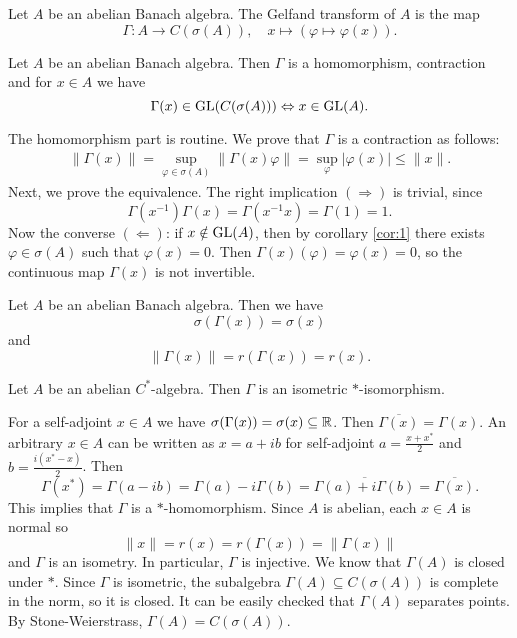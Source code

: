 \begin{definition}
  Let $A$ be an abelian Banach algebra. The Gelfand transform of $A$ is the map 
  $$\Gamma: A \to C(\sigma(A)),\quad x \mapsto (\varphi \mapsto \varphi(x)).$$
\end{definition}

\begin{theorem}
  Let $A$ be an abelian Banach algebra. Then $\Gamma$ is a homomorphism, contraction and for 
  $x \in A$ we have $$\Gamma(x) \in \operatorname{GL}(C(\sigma (A))) \Leftrightarrow x \in \operatorname{GL}(A).$$
\end{theorem}

\begin{myproof}
  The homomorphism part is routine. We prove that $\Gamma$ is a contraction as follows:
  \begin{align*}
    \| \Gamma(x)\| = \sup_{\varphi \in \sigma (A)} \| \Gamma(x) \varphi\| = \sup_{\varphi} |\varphi(x)| \leq \|x\|.
  \end{align*}
  Next, we prove the equivalence. The right implication $(\Rightarrow)$ is trivial, since 
  $$\Gamma(x^{-1}) \Gamma(x) = \Gamma(x^{-1} x) = \Gamma(1) = 1.$$
  Now the converse $(\Leftarrow)$: if $x \notin \operatorname{GL}(A)$,
  then by corollary \ref{cor:1} there exists $\varphi \in \sigma(A)$ such that $\varphi(x) = 0$.
  Then $\Gamma(x) (\varphi) = \varphi(x) = 0$, so the continuous map $\Gamma(x)$ is not invertible.
\end{myproof}

\begin{corollary}
  Let $A$ be an abelian Banach algebra. Then 
  we have $$\sigma (\Gamma(x)) = \sigma (x)$$
  and $$\| \Gamma(x)\| = r (\Gamma(x)) = r(x).$$
\end{corollary}

\begin{theorem}[Gelfand]
  Let $A$ be an abelian $C^*$-algebra. Then $\Gamma$ is an isometric $*$-isomorphism.
\end{theorem}

\begin{myproof}
  For a self-adjoint $x \in A$ we have $\sigma (\Gamma(x)) = \sigma(x) \subseteq \mathbb {R}$.
  Then $\overline{\Gamma(x)} = \Gamma(x)$. An arbitrary $x \in A$ can be written as $x = a + ib$
  for self-adjoint $a= \frac{x + x^*}{2}$ and $b = \frac{i(x^* - x)}{2}$.
  Then $$\Gamma(x^*) = \Gamma(a - ib) = \Gamma(a) - i \Gamma(b) = \overline{\Gamma(a) + i \Gamma(b)} = \overline{\Gamma(x)}.$$
  This implies that $\Gamma$ is a $*$-homomorphism.
  Since $A$ is abelian, each $x \in A$ is normal so 
  $$\| x\| = r(x) = r(\Gamma(x)) = \|\Gamma(x)\|$$
  and $\Gamma$ is an isometry.
  In particular, $\Gamma$ is injective. We know that $\Gamma(A)$ is closed under $*$. Since $\Gamma$
  is isometric, the subalgebra $\Gamma(A) \subseteq C(\sigma(A))$ is complete in the norm, so it is closed. It can be easily checked that $\Gamma (A)$ separates points.
  By Stone-Weierstrass, $\Gamma(A) = C(\sigma(A))$.
\end{myproof}

